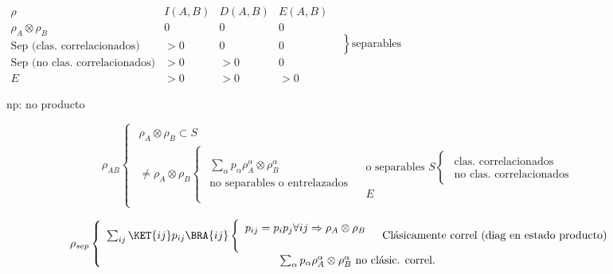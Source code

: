 $\begin{array}{c|c|c|c}
\rho & I(A,B) & D(A,B) & E(A,B)\\
\rho_{A}\otimes\rho_{B} & 0 & 0 & 0\\
\text{Sep (clas. correlacionados)} & >0 & 0 & 0\\
\text{Sep (no clas. correlacionados)} & >0 & >0 & 0\\
E & >0 & >0 & >0
\end{array}\left.\begin{array}{c}
\\
\\
\\
\end{array}\right\} \text{separables}$

np: no producto

\[
\rho_{AB}\begin{cases}
\begin{array}{c}
\rho_{A}\otimes\rho_{B}\subset S\\
\neq\rho_{A}\otimes\rho_{B}\begin{cases}
\begin{array}{c}
\sum_{\alpha}p_{\alpha}\rho_{A}^{\alpha}\otimes\rho_{B}^{\alpha}\\
\text{no separables o entrelazados}
\end{array} & \begin{array}{c}
\text{o separables }S\begin{cases}
\begin{array}{c}
\text{clas. correlacionados}\\
\text{no clas. correlacionados}
\end{array}\end{cases}\\
E
\end{array}\end{cases}
\end{array}\end{cases}
\]

\[
\rho_{sep}\begin{cases}
\begin{array}{c}
\sum_{ij}\KET{ij}p_{ij}\BRA{ij}\begin{cases}
\begin{array}{c}
p_{ij}=p_{i}p_{j}\forall ij\Rightarrow\rho_{A}\otimes\rho_{B}\\
\\
\end{array} & \text{Clásicamente correl (diag en estado producto)}\end{cases}\\
\sum_{\alpha}p_{\alpha}\rho_{A}^{\alpha}\otimes\rho_{B}^{\alpha}\text{ no clásic. correl.}
\end{array}\end{cases}
\]

